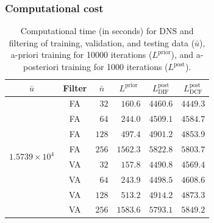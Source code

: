 \documentclass[preprint]{elsarticle}
\newcommand{\p}{\phantom{0}}
\newcommand{\e}[1]{\times 10^{#1}}
\newcommand{\revone}[1]{#1}
\newcommand{\revboth}[1]{#1}
\begin{document}
\subsubsection{Computational cost}

\begin{table}
    \centering
    \begin{tabular}{c c c c c c}
    \toprule

    $\bar{u}$
    & Filter
        & $\bar{n}$
                  & $L^\text{prior}$
                               & $L^\text{post}_{\text{DIF}}$
                                          & $L^\text{post}_{\text{DCF}}$ \\

    \midrule

    \multirow{8}{*}{$1.5739\e{4}$} &
      FA & $\p32$ & $\p160.6$ & $4460.6$ & $4449.3$ \\
    & FA & $\p64$ & $\p244.0$ & $4509.1$ & $4584.7$ \\
    & FA &  $128$ & $\p497.4$ & $4901.2$ & $4853.9$ \\
    & FA &  $256$ & $ 1562.3$ & $5822.8$ & $5803.7$ \\
    & VA & $\p32$ & $\p157.8$ & $4490.8$ & $4569.4$ \\
    & VA & $\p64$ & $\p243.9$ & $4498.5$ & $4608.6$ \\
    & VA &  $128$ & $\p513.2$ & $4914.2$ & $4873.3$ \\
    & VA &  $256$ & $ 1583.6$ & $5793.1$ & $5849.2$ \\

    \bottomrule
\end{tabular}


    \caption{
        Computational time (in seconds) for DNS and filtering of training,
        validation, and testing data ($\bar{u}$), a-priori training for 10000
        iterations ($L^\text{prior}$), and a-posteriori training for
        \revone{ 1000}
        iterations ($L^\text{post}$).
    }
    \label{tab:comptime}
\end{table}
\end{document}
